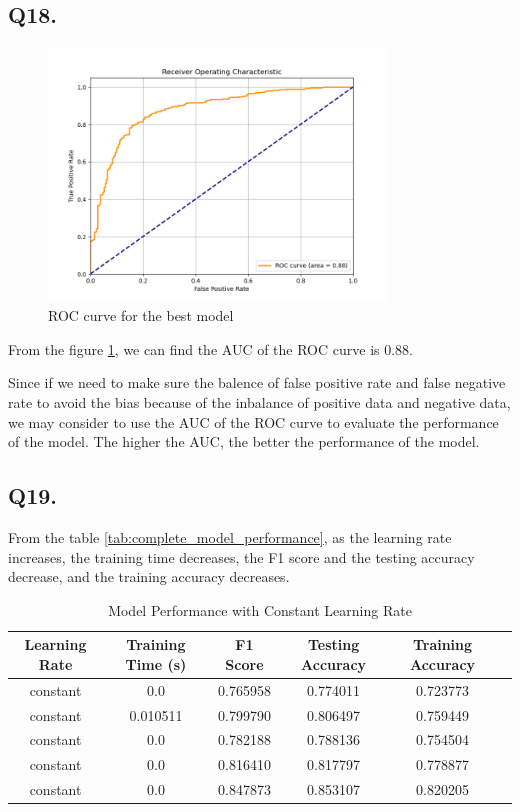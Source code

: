 \documentclass{article}
\begin{document}
\subsection*{Q18.}

\begin{figure}[h!]
    \centering
    \includegraphics[width=0.8\textwidth]{./pic/ROC_curve_set7.png}
    \caption{ROC curve for the best model}
    \label{fig:ROC}
\end{figure}

From the figure \ref{fig:ROC}, we can find the AUC of the ROC curve is 0.88. 

Since if we need to make sure the balence of false positive rate and false negative rate to avoid the bias because of the inbalance of positive data and negative data, we may consider to use the AUC of the ROC curve to evaluate the performance of the model. The higher the AUC, the better the performance of the model.


    
\subsection*{Q19.}

From the table \ref{tab:complete_model_performance}, as the learning rate increases, the training time decreases, the F1 score and the testing accuracy decrease, and the training accuracy decreases.

\begin{table}[htbp]
    \centering
    \begin{tabular}{cccccc}
    \toprule
    Learning Rate & Training Time (s) & F1 Score & Testing Accuracy & Training Accuracy \\
    \midrule
    constant & 0.0 & 0.765958 & 0.774011 & 0.723773 \\
    constant & 0.010511 & 0.799790 & 0.806497 & 0.759449 \\
    constant & 0.0 & 0.782188 & 0.788136 & 0.754504 \\
    constant & 0.0 & 0.816410 & 0.817797 & 0.778877 \\
    constant & 0.0 & 0.847873 & 0.853107 & 0.820205 \\
    \bottomrule
    \end{tabular}
    \caption{Model Performance with Constant Learning Rate}
    \label{tab:model_performance_constant_lr}
\end{table}
\end{document}
